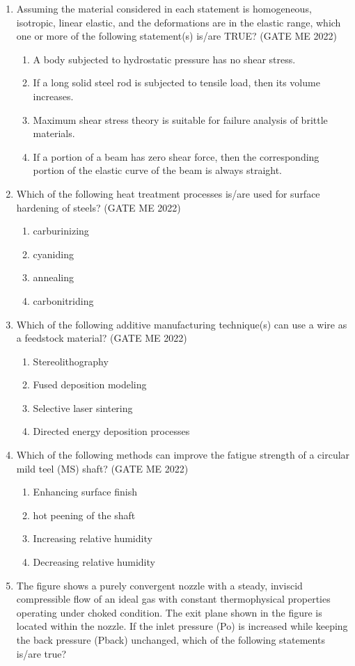 \documentclass[journal]{IEEEtran}
\numberwithin{equation}{enumi}
\numberwithin{figure}{enumi}
\begin{document}
\begin{enumerate}
\item Assuming the material considered in each statement is homogeneous, isotropic, linear
elastic, and the deformations are in the elastic range, which one or more of the
following statement(s) is/are TRUE?
\hfill{(GATE ME 2022)}
\begin{enumerate}
    \item 
A body subjected to hydrostatic pressure has no shear stress.
\item 
If a long solid steel rod is subjected to tensile load, then its volume increases.
\item 
Maximum shear stress theory is suitable for failure analysis of brittle materials.
\item 
If a portion of a beam has zero shear force, then the corresponding portion of the
elastic curve of the beam is always straight.
\end{enumerate}
\item 
Which of the following heat treatment processes is/are used for surface hardening
of steels?
\hfill{(GATE ME 2022)}
\begin{enumerate}
    \item carburinizing
    \item cyaniding
    \item annealing
    \item carbonitriding
\end{enumerate}

\item Which of the following additive manufacturing technique(s) can use a wire as a feedstock material?
\hfill{(GATE ME 2022)}
\begin{enumerate}
    \item Stereolithography
\item Fused deposition modeling
\item Selective laser sintering
\item Directed energy deposition processes
\end{enumerate}

\item 
Which of the following methods can improve the fatigue strength of a circular mild teel (MS) shaft?
\hfill{(GATE ME 2022)}
\begin{enumerate}
    \item Enhancing surface finish
\item hot peening of the shaft
\item Increasing relative humidity
\item Decreasing relative humidity
\end{enumerate}
\item The figure shows a purely convergent nozzle with a steady, inviscid compressible flow of an ideal gas with constant thermophysical properties operating under choked condition. The exit plane shown in the figure is located within the nozzle. If the inlet pressure (Po) is increased while keeping the back pressure (Pback)
unchanged, which of the following statements is/are true?


\end{enumerate}
\end{document}
